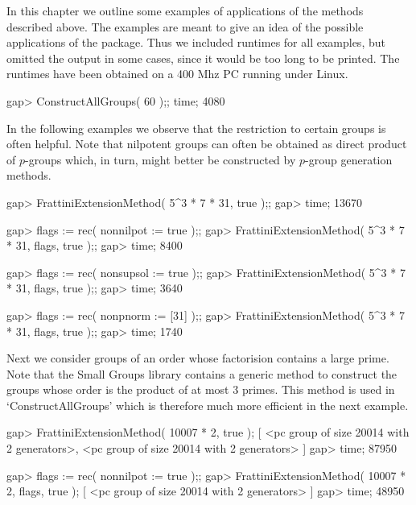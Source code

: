 


In this chapter we outline some examples of applications of
the methods described above. The examples are meant to give
an idea of the possible applications of the package. Thus we
included runtimes for all examples, but omitted the output
in some cases, since it would be too long to be printed.
The runtimes have been obtained on a 400 Mhz PC running under
Linux.

\beginexample
gap> ConstructAllGroups( 60 );; time;
4080
\endexample

In the following examples we observe that the restriction to
certain groups is often helpful. Note that nilpotent groups 
can often be obtained as direct product of $p$-groups which,
in turn, might better be constructed by $p$-group generation
methods.

\beginexample
gap> FrattiniExtensionMethod( 5^3 * 7 * 31, true );;       
gap> time;
13670

gap> flags := rec( nonnilpot := true );; 
gap> FrattiniExtensionMethod( 5^3 * 7 * 31, flags, true );;
gap> time;
8400

gap> flags := rec( nonsupsol := true );;                 
gap> FrattiniExtensionMethod( 5^3 * 7 * 31, flags, true );;
gap> time;
3640

gap> flags := rec( nonpnorm := [31] );;
gap> FrattiniExtensionMethod( 5^3 * 7 * 31, flags, true );;
gap> time;
1740
\endexample

Next we consider groups of an order whose factorision contains
a large prime. Note that the Small Groups library contains a 
generic method to construct the groups whose order is the product 
of at most 3 primes. This method is used in `ConstructAllGroups' 
which is therefore much more efficient in the next example.

\beginexample
gap> FrattiniExtensionMethod( 10007 * 2, true );
[ <pc group of size 20014 with 2 generators>, 
  <pc group of size 20014 with 2 generators> ]
gap> time;
87950

gap> flags := rec( nonnilpot := true );;
gap> FrattiniExtensionMethod( 10007 * 2, flags, true  );                    
[ <pc group of size 20014 with 2 generators> ]
gap> time;
48950

